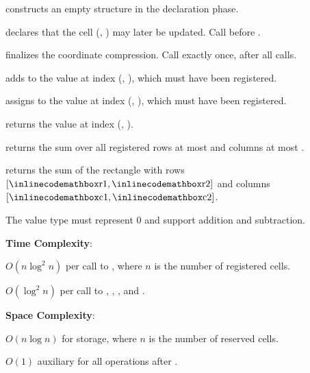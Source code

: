 \begin{compactitem}
  \item {} constructs an empty structure in the declaration phase.
  \item {} declares that the cell (, ) may later be updated. Call before .
  \item {} finalizes the coordinate compression. Call exactly once, after all  calls.
  \item {} adds  to the value at index (, ), which must have been registered.
  \item {} assigns  to the value at index (, ), which must have been registered.
  \item {} returns the value at index (, ).
  \item {} returns the sum over all registered rows at most  and columns at most .
  \item {} returns the sum of the rectangle with rows $[{\inlinecodemath{r1}}, {\inlinecodemath{r2}}]$ and columns $[{\inlinecodemath{c1}}, {\inlinecodemath{c2}}]$.
\end{compactitem}

The value type  must represent $0$ and support addition and subtraction.

\textbf{Time Complexity}:
\begin{compactitem}
  \item $O(n \log^{2} n)$ per call to , where $n$ is the number of registered cells.
  \item $O(\log^{2} n)$ per call to , , , and .
\end{compactitem}

\textbf{Space Complexity}:
\begin{compactitem}
  \item $O(n \log n)$ for storage, where $n$ is the number of reserved cells.
  \item $O(1)$ auxiliary for all operations after .
\end{compactitem}

